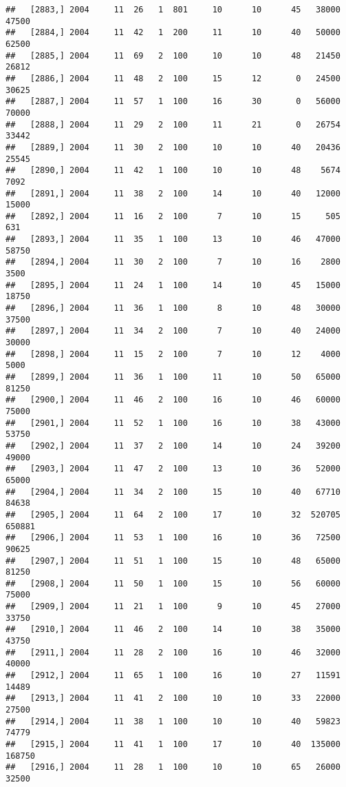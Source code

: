 \documentclass{article}\usepackage[]{graphicx}\usepackage[]{color}
\makeatletter
\newenvironment{kframe}{%
 \def\at@end@of@kframe{}%
 \ifinner\ifhmode%
  \def\at@end@of@kframe{\end{minipage}}%
  \begin{minipage}{\columnwidth}%
 \fi\fi%
 \def\FrameCommand##1{\hskip\@totalleftmargin \hskip-\fboxsep
 \colorbox{shadecolor}{##1}\hskip-\fboxsep
     \hskip-\linewidth \hskip-\@totalleftmargin \hskip\columnwidth}%
 \MakeFramed {\advance\hsize-\width
   \@totalleftmargin\z@ \linewidth\hsize
   \@setminipage}}%
 {\par\unskip\endMakeFramed%
 \at@end@of@kframe}
\newenvironment{knitrout}{}{} %
\makeatother
\begin{document}
\begin{knitrout}
\begin{kframe}
\begin{verbatim}
##   [2883,] 2004     11  26   1  801     10      10      45   38000   47500
##   [2884,] 2004     11  42   1  200     11      10      40   50000   62500
##   [2885,] 2004     11  69   2  100     10      10      48   21450   26812
##   [2886,] 2004     11  48   2  100     15      12       0   24500   30625
##   [2887,] 2004     11  57   1  100     16      30       0   56000   70000
##   [2888,] 2004     11  29   2  100     11      21       0   26754   33442
##   [2889,] 2004     11  30   2  100     10      10      40   20436   25545
##   [2890,] 2004     11  42   1  100     10      10      48    5674    7092
##   [2891,] 2004     11  38   2  100     14      10      40   12000   15000
##   [2892,] 2004     11  16   2  100      7      10      15     505     631
##   [2893,] 2004     11  35   1  100     13      10      46   47000   58750
##   [2894,] 2004     11  30   2  100      7      10      16    2800    3500
##   [2895,] 2004     11  24   1  100     14      10      45   15000   18750
##   [2896,] 2004     11  36   1  100      8      10      48   30000   37500
##   [2897,] 2004     11  34   2  100      7      10      40   24000   30000
##   [2898,] 2004     11  15   2  100      7      10      12    4000    5000
##   [2899,] 2004     11  36   1  100     11      10      50   65000   81250
##   [2900,] 2004     11  46   2  100     16      10      46   60000   75000
##   [2901,] 2004     11  52   1  100     16      10      38   43000   53750
##   [2902,] 2004     11  37   2  100     14      10      24   39200   49000
##   [2903,] 2004     11  47   2  100     13      10      36   52000   65000
##   [2904,] 2004     11  34   2  100     15      10      40   67710   84638
##   [2905,] 2004     11  64   2  100     17      10      32  520705  650881
##   [2906,] 2004     11  53   1  100     16      10      36   72500   90625
##   [2907,] 2004     11  51   1  100     15      10      48   65000   81250
##   [2908,] 2004     11  50   1  100     15      10      56   60000   75000
##   [2909,] 2004     11  21   1  100      9      10      45   27000   33750
##   [2910,] 2004     11  46   2  100     14      10      38   35000   43750
##   [2911,] 2004     11  28   2  100     16      10      46   32000   40000
##   [2912,] 2004     11  65   1  100     16      10      27   11591   14489
##   [2913,] 2004     11  41   2  100     10      10      33   22000   27500
##   [2914,] 2004     11  38   1  100     10      10      40   59823   74779
##   [2915,] 2004     11  41   1  100     17      10      40  135000  168750
##   [2916,] 2004     11  28   1  100     10      10      65   26000   32500

\end{verbatim}
\end{kframe}
\end{knitrout}
\end{document}
